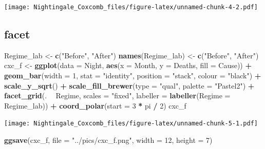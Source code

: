 \documentclass[
]{article}
\newenvironment{Shaded}{\begin{snugshade}}{\end{snugshade}}
\newcommand{\DataTypeTok}[1]{\textcolor[rgb]{0.13,0.29,0.53}{#1}}
\newcommand{\DecValTok}[1]{\textcolor[rgb]{0.00,0.00,0.81}{#1}}
\newcommand{\KeywordTok}[1]{\textcolor[rgb]{0.13,0.29,0.53}{\textbf{#1}}}
\newcommand{\NormalTok}[1]{#1}
\newcommand{\OperatorTok}[1]{\textcolor[rgb]{0.81,0.36,0.00}{\textbf{#1}}}
\newcommand{\StringTok}[1]{\textcolor[rgb]{0.31,0.60,0.02}{#1}}
\begin{document}
\texttt{[image: Nightingale\_Coxcomb\_files/figure-latex/unnamed-chunk-4-2.pdf]}

\hypertarget{facet}{%
\subsection{facet}\label{facet}}

\begin{Shaded}
\begin{Highlighting}[]
\NormalTok{Regime_lab <-}\StringTok{ }\KeywordTok{c}\NormalTok{(}\StringTok{"Before"}\NormalTok{, }\StringTok{"After"}\NormalTok{)}
\KeywordTok{names}\NormalTok{(Regime_lab) <-}\StringTok{ }\KeywordTok{c}\NormalTok{(}\StringTok{"Before"}\NormalTok{, }\StringTok{"After"}\NormalTok{)}
\NormalTok{cxc_f <-}\StringTok{ }
\StringTok{  }\KeywordTok{ggplot}\NormalTok{(}\DataTypeTok{data =}\NormalTok{ Night,}
         \KeywordTok{aes}\NormalTok{(}\DataTypeTok{x =}\NormalTok{ Month, }
             \DataTypeTok{y =}\NormalTok{ Deaths, }
             \DataTypeTok{fill =}\NormalTok{ Cause)) }\OperatorTok{+}
\StringTok{  }\KeywordTok{geom_bar}\NormalTok{(}\DataTypeTok{width =} \DecValTok{1}\NormalTok{, }
           \DataTypeTok{stat =} \StringTok{"identity"}\NormalTok{, }
           \DataTypeTok{position =} \StringTok{"stack"}\NormalTok{, }
           \DataTypeTok{colour =} \StringTok{"black"}\NormalTok{) }\OperatorTok{+}
\StringTok{  }\KeywordTok{scale_y_sqrt}\NormalTok{() }\OperatorTok{+}
\StringTok{  }\KeywordTok{scale_fill_brewer}\NormalTok{(}\DataTypeTok{type =} \StringTok{"qual"}\NormalTok{, }\DataTypeTok{palette =} \StringTok{"Pastel2"}\NormalTok{) }\OperatorTok{+}
\StringTok{  }\KeywordTok{facet_grid}\NormalTok{(. }\OperatorTok{~}\StringTok{ }\NormalTok{Regime, }
             \DataTypeTok{scales =} \StringTok{"fixed"}\NormalTok{, }
             \DataTypeTok{labeller =} \KeywordTok{labeller}\NormalTok{(}\DataTypeTok{Regime =}\NormalTok{ Regime_lab)) }\OperatorTok{+}
\StringTok{  }\KeywordTok{coord_polar}\NormalTok{(}\DataTypeTok{start =} \DecValTok{3} \OperatorTok{*}\StringTok{ }\NormalTok{pi }\OperatorTok{/}\StringTok{ }\DecValTok{2}\NormalTok{)}
\NormalTok{cxc_f}
\end{Highlighting}
\end{Shaded}

\texttt{[image: Nightingale\_Coxcomb\_files/figure-latex/unnamed-chunk-5-1.pdf]}

\begin{Shaded}
\begin{Highlighting}[]
\KeywordTok{ggsave}\NormalTok{(cxc_f, }\DataTypeTok{file =} \StringTok{"../pics/cxc_f.png"}\NormalTok{, }\DataTypeTok{width =} \DecValTok{12}\NormalTok{, }\DataTypeTok{height =} \DecValTok{7}\NormalTok{)}
\end{Highlighting}
\end{Shaded}
\end{document}
